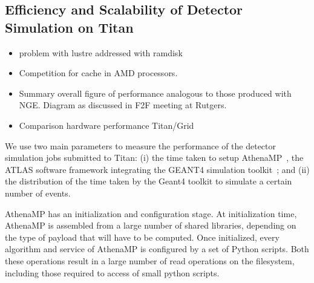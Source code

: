 
\subsection{Efficiency and Scalability of Detector Simulation on Titan}
\label{ssec:panda_titan}

\begin{itemize}
    \item problem with lustre addressed with ramdisk
    \item Competition for cache in AMD processors.
    \item Summary overall figure of performance analogous to those produced with NGE. Diagram as discussed in F2F meeting at Rutgers.
    \item Comparison hardware performance Titan/Grid
\end{itemize}

We use two main parameters to measure the performance of the detector simulation
jobs submitted to Titan: (i) the time taken to setup
AthenaMP~\cite{aad2010atlas}, the ATLAS software framework integrating the
GEANT4 simulation toolkit~\cite{agostinelli2003geant4}; and (ii) the
distribution of the time taken by the Geant4 toolkit to simulate a certain
number of events.

AthenaMP has an initialization and configuration stage. At initialization time,
AthenaMP is assembled from a large number of shared libraries, depending on the
type of payload that will have to be computed. Once initialized, every algorithm
and service of AthenaMP is configured by a set of Python scripts. Both these
operations result in a large number of read operations on the filesystem,
including those required to access of small python scripts.



